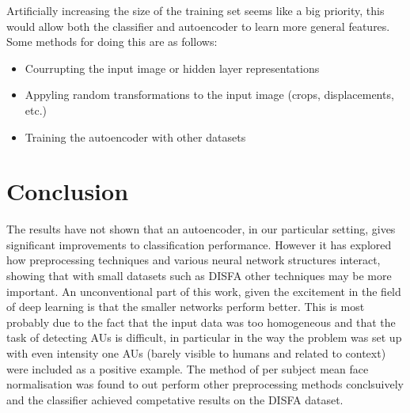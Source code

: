     Artificially increasing the size of the training set seems like a big priority,
    this would allow both the classifier and autoencoder to learn more general features.
    Some methods for doing this are as follows:

    \begin{itemize}
      \item Courrupting the input image or hidden layer representations
      \item Appyling random transformations to the input image (crops, displacements, etc.)
      \item Training the autoencoder with other datasets
    \end{itemize}


  \section{Conclusion}
    The results have not shown that an autoencoder, in our particular setting,
    gives significant improvements to classification performance. However it has
    explored how preprocessing techniques and various neural network structures
    interact, showing that with small datasets such as DISFA other techniques may
    be more important. An unconventional part of this work, given the excitement
    in the field of deep learning is that the smaller networks perform better.
    This is most probably due to the fact that the input data was too homogeneous
    and that the task of detecting AUs is difficult, in particular in the way the problem was set up
    with even intensity one AUs (barely visible to humans and related to context)
    were included as a positive example. The method of per subject mean face normalisation was
    found to out perform other preprocessing methods conclsuively and the classifier
    achieved competative results on the DISFA dataset.
